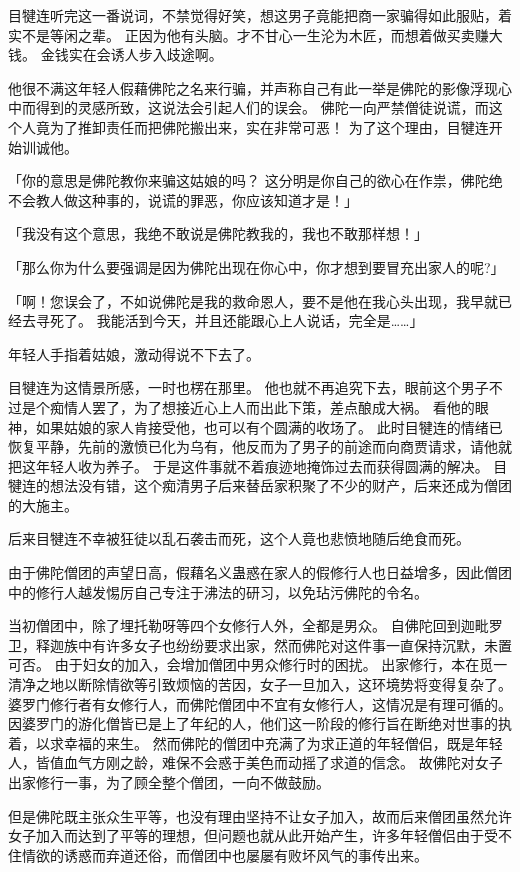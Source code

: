 \documentclass[twoside,openany]{book}
\begin{document}
目犍连听完这一番说词，不禁觉得好笑，想这男子竟能把商一家骗得如此服贴，着实不是等闲之辈。
正因为他有头脑。才不甘心一生沦为木匠，而想着做买卖赚大钱。
金钱实在会诱人步入歧途啊。

他很不满这年轻人假藉佛陀之名来行骗，并声称自己有此一举是佛陀的影像浮现心中而得到的灵感所致，这说法会引起人们的误会。
佛陀一向严禁僧徒说谎，而这个人竟为了推卸责任而把佛陀搬出来，实在非常可恶！
为了这个理由，目犍连开始训诚他。

「你的意思是佛陀教你来骗这姑娘的吗？
这分明是你自己的欲心在作祟，佛陀绝不会教人做这种事的，说谎的罪恶，你应该知道才是！」

「我没有这个意思，我绝不敢说是佛陀教我的，我也不敢那样想！」

「那么你为什么要强调是因为佛陀出现在你心中，你才想到要冒充出家人的呢?」

「啊！您误会了，不如说佛陀是我的救命恩人，要不是他在我心头出现，我早就已经去寻死了。
我能活到今天，并且还能跟心上人说话，完全是……」

年轻人手指着姑娘，激动得说不下去了。

目犍连为这情景所感，一时也楞在那里。
他也就不再追究下去，眼前这个男子不过是个痴情人罢了，为了想接近心上人而出此下策，差点酿成大祸。
看他的眼神，如果姑娘的家人肯接受他，也可以有个圆满的收场了。
此时目犍连的情绪已恢复平静，先前的激愤已化为乌有，他反而为了男子的前途而向商贾请求，请他就把这年轻人收为养子。
于是这件事就不着痕迹地掩饰过去而获得圆满的解决。
目犍连的想法没有错，这个痴清男子后来替岳家积聚了不少的财产，后来还成为僧团的大施主。

后来目犍连不幸被狂徒以乱石袭击而死，这个人竟也悲愤地随后绝食而死。

由于佛陀僧团的声望日高，假藉名义蛊惑在家人的假修行人也日益增多，因此僧团中的修行人越发惕厉自己专注于沸法的研习，以免玷污佛陀的令名。

当初僧团中，除了埋托勒呀等四个女修行人外，全都是男众。
自佛陀回到迦毗罗卫，释迦族中有许多女子也纷纷要求出家，然而佛陀对这件事一直保持沉默，未置可否。
由于妇女的加入，会增加僧团中男众修行时的困扰。
出家修行，本在觅一清净之地以断除情欲等引致烦恼的苦因，女子一旦加入，这环境势将变得复杂了。
婆罗门修行者有女修行人，而佛陀僧团中不宜有女修行人，这情况是有理可循的。
因婆罗门的游化僧皆已是上了年纪的人，他们这一阶段的修行旨在断绝对世事的执着，以求幸福的来生。
然而佛陀的僧团中充满了为求正道的年轻僧侣，既是年轻人，皆值血气方刚之龄，难保不会惑于美色而动摇了求道的信念。
故佛陀对女子出家修行一事，为了顾全整个僧团，一向不做鼓励。

但是佛陀既主张众生平等，也没有理由坚持不让女子加入，故而后来僧团虽然允许女子加入而达到了平等的理想，但问题也就从此开始产生，许多年轻僧侣由于受不住情欲的诱惑而弃道还俗，而僧团中也屡屡有败坏风气的事传出来。
\end{document}
